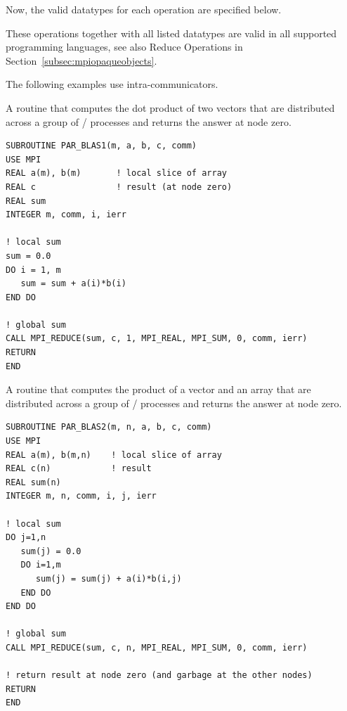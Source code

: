 Now, the valid datatypes for each operation are specified below.

\begin{constlist}[170pt]
\noconstitem{}{ }
\end{constlist}

These operations together with all listed
datatypes are valid in all supported programming languages, see also
Reduce Operations in
Section~\ref{subsec:mpiopaqueobjects}.

The following examples use intra-communicators.

\begin{example}
\label{coll-exblas1}
%
A routine that computes
the dot product of two vectors that are distributed across a
group of \MPI/ processes and returns the answer at node zero.

\begin{lstlisting}[language={[MPI]Fortran}]
SUBROUTINE PAR_BLAS1(m, a, b, c, comm)
USE MPI
REAL a(m), b(m)       ! local slice of array
REAL c                ! result (at node zero)
REAL sum
INTEGER m, comm, i, ierr

! local sum
sum = 0.0
DO i = 1, m
   sum = sum + a(i)*b(i)
END DO

! global sum
CALL MPI_REDUCE(sum, c, 1, MPI_REAL, MPI_SUM, 0, comm, ierr)
RETURN
END
\end{lstlisting}
\end{example}

\begin{example}
\label{coll-exblas2}
%
A routine that computes
the product of a vector and an array that are distributed across a
group of \MPI/ processes and returns the answer at node zero.

\begin{lstlisting}[language={[MPI]Fortran}]
SUBROUTINE PAR_BLAS2(m, n, a, b, c, comm)
USE MPI
REAL a(m), b(m,n)    ! local slice of array
REAL c(n)            ! result
REAL sum(n)
INTEGER m, n, comm, i, j, ierr

! local sum
DO j=1,n
   sum(j) = 0.0
   DO i=1,m
      sum(j) = sum(j) + a(i)*b(i,j)
   END DO
END DO

! global sum
CALL MPI_REDUCE(sum, c, n, MPI_REAL, MPI_SUM, 0, comm, ierr)

! return result at node zero (and garbage at the other nodes)
RETURN
END
\end{lstlisting}
\end{example}

